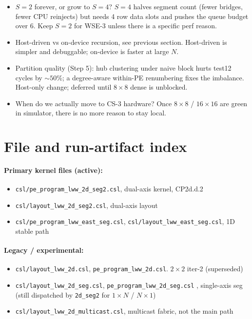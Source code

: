 \documentclass[11pt]{article}
\newcommand{\code}[1]{\texttt{#1}}
\newcommand{\file}[1]{\texttt{#1}}
\begin{document}
\begin{itemize}[leftmargin=1.3em,itemsep=0.3em]
  \item $S=2$ forever, or grow to $S=4$? $S=4$ halves segment
    count (fewer bridges, fewer CPU reinjects) but needs 4 row
    data slots and pushes the queue budget over 6. Keep $S=2$
    for WSE-3 unless there is a specific perf reason.
  \item Host-driven vs on-device recursion, see previous
    section. Host-driven is simpler and debuggable; on-device is
    faster at large $N$.
  \item Partition quality (Step 5): hub clustering under naive
    block hurts test12 cycles by $\sim 50\%$; a degree-aware
    within-PE renumbering fixes the imbalance. Host-only
    change; deferred until $8\times 8$ dense is unblocked.
  \item When do we actually move to CS-3 hardware? Once
    $8\times 8$ / $16\times 16$ are green in simulator, there is
    no more reason to stay local.
\end{itemize}

\section{File and run-artifact index}

\paragraph{Primary kernel files (active):}
\begin{itemize}[leftmargin=1.3em,itemsep=0.15em]
  \item \file{csl/pe\_program\_lww\_2d\_seg2.csl}, dual-axis kernel, CP2d.d.2
  \item \file{csl/layout\_lww\_2d\_seg2.csl}, dual-axis layout
  \item \file{csl/pe\_program\_lww\_east\_seg.csl},
    \file{csl/layout\_lww\_east\_seg.csl}, 1D stable path
\end{itemize}

\paragraph{Legacy / experimental:}
\begin{itemize}[leftmargin=1.3em,itemsep=0.15em]
  \item \file{csl/layout\_lww\_2d.csl}, \file{pe\_program\_lww\_2d.csl}.
    $2\times 2$ iter-2 (superseded)
  \item \file{csl/layout\_lww\_2d\_seg.csl}, \file{pe\_program\_lww\_2d\_seg.csl}
   , single-axis seg (still dispatched by \code{2d\_seg2} for
    $1\times N$ / $N\times 1$)
  \item \file{csl/layout\_lww\_2d\_multicast.csl}, multicast fabric, not the
    main path
\end{itemize}
\end{document}
